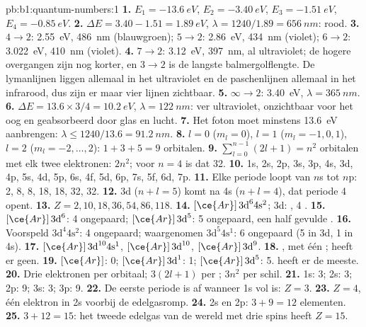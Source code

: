 \begin{solution}{pb:b1:quantum-numbers:1}
\textbf{1.} $E_1 = \qty{-13.6}{eV}$, $E_2 = \qty{-3.40}{eV}$,
$E_3 = \qty{-1.51}{eV}$, $E_4 = \qty{-0.85}{eV}$.
\textbf{2.} $\Delta E = 3.40 - 1.51 = \qty{1.89}{eV}$, $\lambda = 1240/1.89
= \qty{656}{nm}$: rood.
\textbf{3.} $4 \to 2$: \qty{2.55}{eV}, \qty{486}{nm} (blauwgroen);
$5 \to 2$: \qty{2.86}{eV}, \qty{434}{nm} (violet); $6 \to 2$: \qty{3.022}{eV},
\qty{410}{nm} (violet).
\textbf{4.} $7 \to 2$: \qty{3.12}{eV}, \qty{397}{nm}, al ultraviolet;
de hogere overgangen zijn nog korter, en $3 \to 2$ is de langste
balmergolflengte. De lymanlijnen liggen allemaal in het ultraviolet en de
paschenlijnen allemaal in het infrarood, dus zijn er maar vier lijnen
zichtbaar.
\textbf{5.} $\infty \to 2$: \qty{3.40}{eV}, $\lambda = \qty{365}{nm}$.
\textbf{6.} $\Delta E = 13.6 \times 3/4 = \qty{10.2}{eV}$, $\lambda =
\qty{122}{nm}$: ver ultraviolet, onzichtbaar voor het oog en
geabsorbeerd door glas en lucht.
\textbf{7.} Het foton moet minstens \qty{13.6}{eV} aanbrengen: $\lambda \le
1240/13.6 = \qty{91.2}{nm}$.
\textbf{8.} $l = 0$ ($m_l = 0$), $l = 1$ ($m_l = -1, 0, 1$), $l = 2$
($m_l = -2, \dots, 2$): $1 + 3 + 5 = 9$ orbitalen.
\textbf{9.} $\sum_{l=0}^{n-1}(2l+1) = n^2$ orbitalen met elk twee
elektronen: $2n^2$; voor $n = 4$ is dat 32.
\textbf{10.} 1s, 2s, 2p, 3s, 3p, 4s, 3d, 4p, 5s, 4d, 5p, 6s, 4f, 5d, 6p,
7s, 5f, 6d, 7p.
\textbf{11.} Elke periode loopt van $n$s tot $n$p: 2, 8, 8, 18, 18, 32, 32.
\textbf{12.} 3d ($n + l = 5$) komt na 4s ($n + l = 4$), dat periode 4
opent.
\textbf{13.} $Z = 2, 10, 18, 36, 54, 86, 118$.
\textbf{14.} $[\ce{Ar}]\,3\text{d}^6 4\text{s}^2$; 3d: ,
4 .
\textbf{15.}  $[\ce{Ar}]\,3\text{d}^6$: 4 ongepaard;
 $[\ce{Ar}]\,3\text{d}^5$: 5 ongepaard, een half gevulde .
\textbf{16.} Voorspeld $3\text{d}^4 4\text{s}^2$: 4 ongepaard; waargenomen
$3\text{d}^5 4\text{s}^1$: 6 ongepaard (5 in 3d, 1 in 4s).
\textbf{17.}  $[\ce{Ar}]\,3\text{d}^{10} 4\text{s}^1$, 
$[\ce{Ar}]\,3\text{d}^{10}$,  $[\ce{Ar}]\,3\text{d}^9$.
\textbf{18.} , met één ;  heeft er geen.
\textbf{19.}  $[\ce{Ar}]$: 0;  $[\ce{Ar}]\,3\text{d}^1$:
1;  $[\ce{Ar}]\,3\text{d}^5$: 5.  heeft er de meeste.
\textbf{20.} Drie elektronen per orbitaal; $3(2l + 1)$ per ;
$3n^2$ per schil.
\textbf{21.} 1s: 3; 2s: 3; 2p: 9; 3s: 3; 3p: 9.
\textbf{22.} De eerste periode is af wanneer 1s vol is: $Z = 3$.
\textbf{23.} $Z = 4$, één elektron in 2s voorbij de edelgasromp.
\textbf{24.} 2s en 2p: $3 + 9 = 12$ elementen.
\textbf{25.} $3 + 12 = 15$: het tweede edelgas van de wereld met drie
spins heeft \textbf{$Z = 15$}.
\end{solution}

